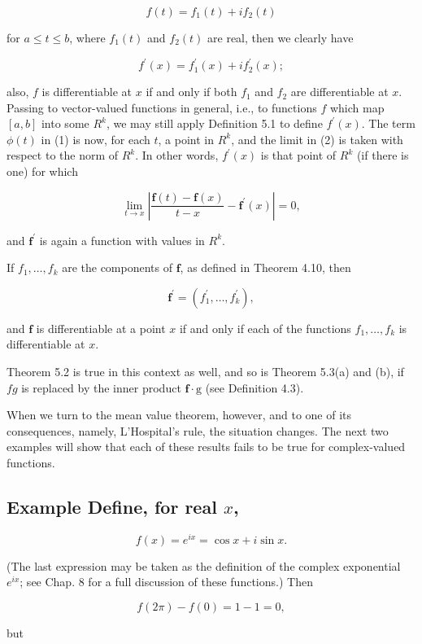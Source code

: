 \documentclass[10pt]{article}
\begin{document}
$$
f(t)=f_{1}(t)+i f_{2}(t)
$$

for $a \leq t \leq b$, where $f_{1}(t)$ and $f_{2}(t)$ are real, then we clearly have

$$
f^{\prime}(x)=f_{1}^{\prime}(x)+i f_{2}^{\prime}(x) ;
$$

also, $f$ is differentiable at $x$ if and only if both $f_{1}$ and $f_{2}$ are differentiable at $x$. Passing to vector-valued functions in general, i.e., to functions $f$ which map $[a, b]$ into some $R^{k}$, we may still apply Definition 5.1 to define $f^{\prime}(x)$. The term $\phi(t)$ in (1) is now, for each $t$, a point in $R^{k}$, and the limit in (2) is taken with respect to the norm of $R^{k}$. In other words, $f^{\prime}(x)$ is that point of $R^{k}$ (if there is one) for which

$$
\lim _{t \rightarrow x}\left|\frac{\mathbf{f}(t)-\mathbf{f}(x)}{t-x}-\mathbf{f}^{\prime}(x)\right|=0,
$$

and $\mathbf{f}^{\prime}$ is again a function with values in $R^{k}$.

If $f_{1}, \ldots, f_{k}$ are the components of $\mathbf{f}$, as defined in Theorem 4.10, then

$$
\mathbf{f}^{\prime}=\left(f_{1}^{\prime}, \ldots, f_{k}^{\prime}\right),
$$

and $\mathbf{f}$ is differentiable at a point $x$ if and only if each of the functions $f_{1}, \ldots, f_{k}$ is differentiable at $x$.

Theorem 5.2 is true in this context as well, and so is Theorem 5.3(a) and (b), if $f g$ is replaced by the inner product $\mathbf{f} \cdot \mathrm{g}$ (see Definition 4.3).

When we turn to the mean value theorem, however, and to one of its consequences, namely, L'Hospital's rule, the situation changes. The next two examples will show that each of these results fails to be true for complex-valued functions.

\subsection{Example Define, for real $x$,}
$$
f(x)=e^{i x}=\cos x+i \sin x .
$$

(The last expression may be taken as the definition of the complex exponential $e^{i x}$; see Chap. 8 for a full discussion of these functions.) Then

$$
f(2 \pi)-f(0)=1-1=0,
$$

but
\end{document}
